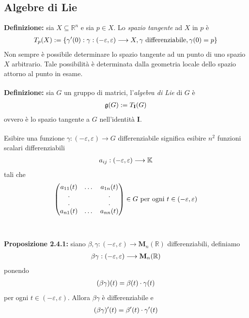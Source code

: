 \documentclass{article}
\begin{document}
\newpage
\subsection{Algebre di Lie}
\textbf{Definizione:} sia $X \subseteq \mathbb{R}^n$ e sia $p \in X$. Lo \textit{spazio tangente} ad $X$ in $p$ è
\begin{gather}
    T_p(X) := \{ \gamma'(0) : \gamma : (-\varepsilon, \varepsilon) \longrightarrow X, \gamma \text{ differenziabile}, \gamma(0) = p \} \notag
\end{gather}
Non sempre è possibile determinare lo spazio tangente ad un punto di uno spazio $X$ arbitrario. Tale possibilità è determinata dalla geometria locale dello spazio attorno al punto in esame. \\ \\
\textbf{Definizione:} sia $G$ un gruppo di matrici, l'\textit{algebra di Lie} di $G$ è
\begin{gather}
    \mathfrak{g}(G) := T_{\mathbf{I}}(G) \notag
\end{gather}
ovvero è lo spazio tangente a $G$ nell'identità $\mathbf{I}$. \\ \\
Esibire una funzione $\gamma : (-\varepsilon, \varepsilon) \longrightarrow G$ differenziabile significa esibire $n^2$ funzioni scalari differenziabili
\begin{gather}
    a_{ij} : (-\varepsilon, \varepsilon) \longrightarrow \mathbb{K} \notag
\end{gather}
tali che
\begin{gather}
    \begin{pmatrix}
        a_{11}(t) & \dots & a_{1n}(t) \\
        . & & . \\
        . & & . \\
        a_{n1}(t) & \dots & a_{nn}(t) 
    \end{pmatrix} \in G \text{ per ogni } t \in (-\varepsilon, \varepsilon) \notag
\end{gather} \\ \\
\textbf{Proposizione 2.4.1:} siano $\beta, \gamma : (-\varepsilon, \varepsilon) \longrightarrow \mathbf{M}_n(\mathbb{R})$ differenziabili, definiamo
\begin{gather}
    \beta\gamma : (-\varepsilon, \varepsilon) \longrightarrow \mathbf{M}_n(\mathbb{R}) \notag
\end{gather}
ponendo
\begin{gather}
    (\beta\gamma)(t) = \beta(t) \cdot \gamma(t) \notag
\end{gather}
per ogni $t \in (-\varepsilon, \varepsilon)$. Allora $\beta\gamma$ è differenziabile e
\begin{gather}
    (\beta\gamma)'(t) = \beta'(t) \cdot \gamma'(t) \notag
\end{gather} \\
\end{document}
